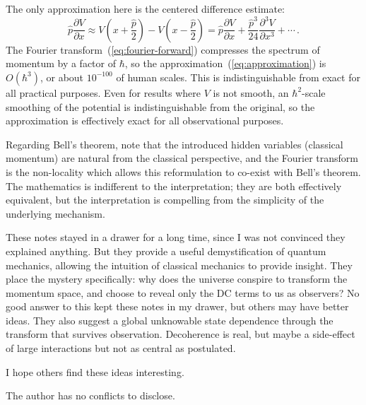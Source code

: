 \documentclass[prb,preprint]{revtex4-1}
\begin{document}
The only approximation here is the centered difference estimate:
\begin{equation}\label{eq:approximation}
\hat{p} \frac{\partial V}{\partial x}
\approx V\!\left(x+\frac{\hat{p}}{2}\right) - V\!\left(x-\frac{\hat{p}}{2}\right)
= \hat{p} \frac{\partial V}{\partial x} + \frac{\hat{p}^3}{24}\frac{\partial^3 V}{\partial x^3} + \cdots \,.
\end{equation}
The Fourier transform~(\ref{eq:fourier-forward}) compresses the spectrum of momentum by a factor
of $\hbar$, so the approximation~(\ref{eq:approximation}) is $O(\hbar^3)$, or about $10^{-100}$ of
human scales.  This is indistinguishable from exact for all practical purposes.  Even for
results where $V$ is not smooth, an $\hbar^2$-scale smoothing of the potential is indistinguishable
from the original, so the approximation is effectively exact for all observational purposes.

Regarding Bell's theorem,\cite{bell1964,bell1987} note that the introduced hidden variables (classical
momentum) are natural from the classical perspective, and the Fourier transform is the
non-locality which allows this reformulation to co-exist with Bell's theorem.  The mathematics
is indifferent to the interpretation; they are both effectively equivalent, but the interpretation
is compelling from the simplicity of the underlying mechanism.

These notes stayed in a drawer for a long time, since I was not convinced they explained
anything.  But they provide a useful demystification of quantum mechanics, allowing the intuition
of classical mechanics to provide insight.  They place the mystery specifically: why does the
universe conspire to transform the momentum space, and choose to reveal only the DC terms to
us as observers?  No good answer to this kept these notes in my drawer, but others may have
better ideas.  They also suggest a global unknowable state dependence through the transform
that survives observation.  Decoherence is real, but maybe a side-effect of large interactions
but not as central as postulated.

I hope others find these ideas interesting.


\begin{acknowledgments}
The author has no conflicts to disclose.
\end{acknowledgments}
\end{document}
